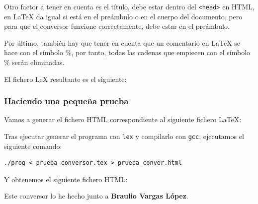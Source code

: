 \documentclass[10pt,a4paper,spanish]{report}
\begin{document}
Otro factor a tener en cuenta es el título, debe estar dentro del \texttt{<head>} en HTML, en LaTeX da igual si está en el preámbulo o en el cuerpo del documento, pero para que el conversor funcione correctamente, debe estar en el preámbulo.

Por último, también hay que tener en cuenta que un comentario en LaTeX se hace con el símbolo \%, por tanto, todas las cadenas que empiecen con el símbolo \% serán eliminadas.

El fichero LeX resultante es el siguiente:

\subsubsection{\textcolor{p5}Haciendo una pequeña prueba}
Vamos a generar el fichero HTML correspondiente al siguiente fichero LaTeX:


Tras ejecutar generar el programa con \texttt{lex} y compilarlo con \texttt{gcc}, ejecutamos el siguiente comando:
\begin{verbatim}
./prog < prueba_conversor.tex > prueba_conver.html
\end{verbatim}

Y obtenemos el siguiente fichero HTML:

Este conversor lo he hecho junto a \textbf{Braulio Vargas López}.

\newpage
\thispagestyle{empty}

\\[2.5cm]
\end{document}
